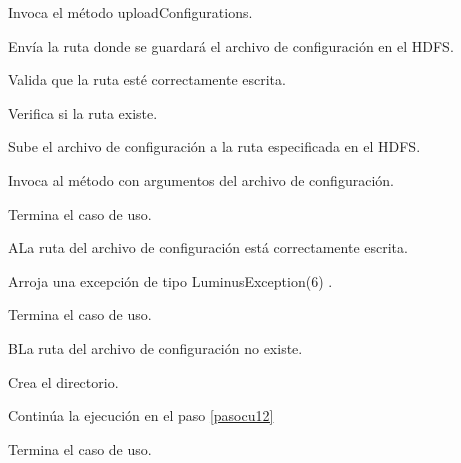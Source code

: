
	\begin{UCtrayectoria}

		\UCpaso[\UCactor] Invoca el método uploadConfigurations.

		\UCpaso[\UCactor] Envía la ruta donde se guardará el archivo de configuración en el HDFS.

		\UCpaso[\UCsist] Valida que la ruta esté correctamente escrita. 

		\UCpaso[\UCsist] Verifica si la ruta existe. 

		\UCpaso[\UCsist] Sube el archivo de configuración a la ruta especificada en el HDFS. \label{pasocu12}

		\UCpaso[\UCsist] Invoca al método  con argumentos del archivo de configuración.

		\UCpaso[] Termina el caso de uso.

	\end{UCtrayectoria}

	\begin{UCtrayectoriaA}{A}{La ruta del archivo de configuración está correctamente escrita.}

		\UCpaso[\UCsist] Arroja una excepción de tipo LuminusException(6) .

		\UCpaso[] Termina el caso de uso.

	\end{UCtrayectoriaA}

	\begin{UCtrayectoriaA}{B}{La ruta del archivo de configuración no existe.}

		\UCpaso[\UCsist] Crea el directorio.

		\UCpaso[\UCsist] Continúa la ejecución en el paso \ref{pasocu12}

		\UCpaso[] Termina el caso de uso.

	\end{UCtrayectoriaA}


